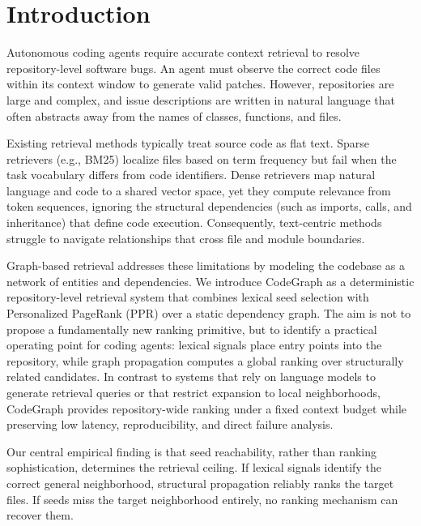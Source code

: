 \section{Introduction}
\label{sec:introduction}

Autonomous coding agents require accurate context retrieval to resolve repository-level software bugs. An agent must observe the correct code files within its context window to generate valid patches. However, repositories are large and complex, and issue descriptions are written in natural language that often abstracts away from the names of classes, functions, and files.

Existing retrieval methods typically treat source code as flat text. Sparse retrievers (e.g., BM25) localize files based on term frequency but fail when the task vocabulary differs from code identifiers. Dense retrievers map natural language and code to a shared vector space, yet they compute relevance from token sequences, ignoring the structural dependencies (such as imports, calls, and inheritance) that define code execution. Consequently, text-centric methods struggle to navigate relationships that cross file and module boundaries.

Graph-based retrieval addresses these limitations by modeling the codebase as a network of entities and dependencies. We introduce CodeGraph as a deterministic repository-level retrieval system that combines lexical seed selection with Personalized PageRank (PPR) over a static dependency graph. The aim is not to propose a fundamentally new ranking primitive, but to identify a practical operating point for coding agents: lexical signals place entry points into the repository, while graph propagation computes a global ranking over structurally related candidates. In contrast to systems that rely on language models to generate retrieval queries or that restrict expansion to local neighborhoods, CodeGraph provides repository-wide ranking under a fixed context budget while preserving low latency, reproducibility, and direct failure analysis.

Our central empirical finding is that seed reachability, rather than ranking sophistication, determines the retrieval ceiling. If lexical signals identify the correct general neighborhood, structural propagation reliably ranks the target files. If seeds miss the target neighborhood entirely, no ranking mechanism can recover them. 

